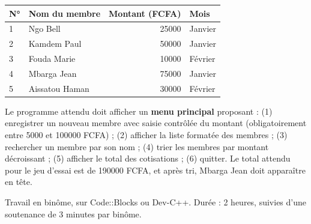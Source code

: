 \documentclass[11pt]{article}
\newcounter{popsec}
\newcounter{popsub}
\newcommand{\courssub}[1]{%
  \stepcounter{popsub}%
  \par\vspace{9pt}\noindent{\popxbold\fontsize{11.5}{13}\selectfont\color{popink}{\color{poporange}\thepopsec.\thepopsub}\hspace{6pt}#1}\par\nopagebreak\vspace{4pt}
}
\begin{document}
\begin{center}
\begin{tabularx}{\linewidth}{|l|X|r|l|}
\hline
\rowcolor{popblueL} \textbf{N°} & \textbf{Nom du membre} & \textbf{Montant (FCFA)} & \textbf{Mois} \\
\hline
1 & Ngo Bell & \num{25000} & Janvier \\
\hline
2 & Kamdem Paul & \num{50000} & Janvier \\
\hline
3 & Fouda Marie & \num{10000} & Février \\
\hline
4 & Mbarga Jean & \num{75000} & Janvier \\
\hline
5 & Aissatou Haman & \num{30000} & Février \\
\hline
\end{tabularx}
\end{center}

Le programme attendu doit afficher un \textbf{menu principal} proposant : (1) enregistrer un nouveau membre avec saisie contrôlée du montant (obligatoirement entre \num{5000} et \num{100000} FCFA) ; (2) afficher la liste formatée des membres ; (3) rechercher un membre par son nom ; (4) trier les membres par montant décroissant ; (5) afficher le total des cotisations ; (6) quitter. Le total attendu pour le jeu d'essai est de \num{190000} FCFA, et après tri, Mbarga Jean doit apparaître en tête.

\courssub{Consignes}

Travail en binôme, sur Code::Blocks ou Dev-C++. Durée : 2 heures, suivies d'une soutenance de 3 minutes par binôme.
\end{document}
